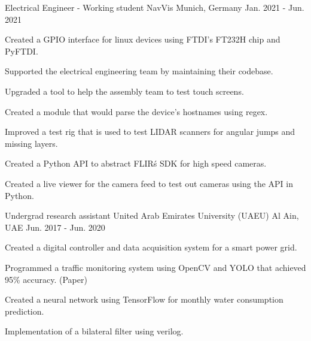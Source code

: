 \begin{cventries}
    \cventry
    {Electrical Engineer - Working student} %
    {NavVis} %
    {Munich, Germany} %
    {Jan. 2021 - Jun. 2021} %
    { %
        \begin{cvitems}
            \item {Created a GPIO interface for linux devices using FTDI’s FT232H chip and PyFTDI.}
            \item {Supported the electrical engineering team by maintaining their codebase.}
            \item {Upgraded a tool to help the assembly team to test touch screens.}
            \item {Created a module that would parse the device’s hostnames using regex.}
            \item {Improved a test rig that is used to test LIDAR scanners for angular jumps and missing layers.}
            \item {Created a Python API to abstract FLIR\'s SDK for high speed cameras.}
            \item {Created a live viewer for the camera feed to test out cameras using the API in Python.}
        \end{cvitems}
    }


    \cventry
    {Undergrad research assistant} %
    {United Arab Emirates University (UAEU)} %
    {Al Ain, UAE} %
    {Jun. 2017 - Jun. 2020} %
    { %
        \begin{cvitems}
            \item {Created a digital controller and data acquisition system for a smart power grid.}
            \item {Programmed a traffic monitoring system using OpenCV and YOLO that achieved 95\% accuracy. (Paper)}
            \item {Created a neural network using TensorFlow for monthly water consumption prediction.}
            \item {Implementation of a bilateral filter using verilog.}
        \end{cvitems}
    }



\end{cventries}
